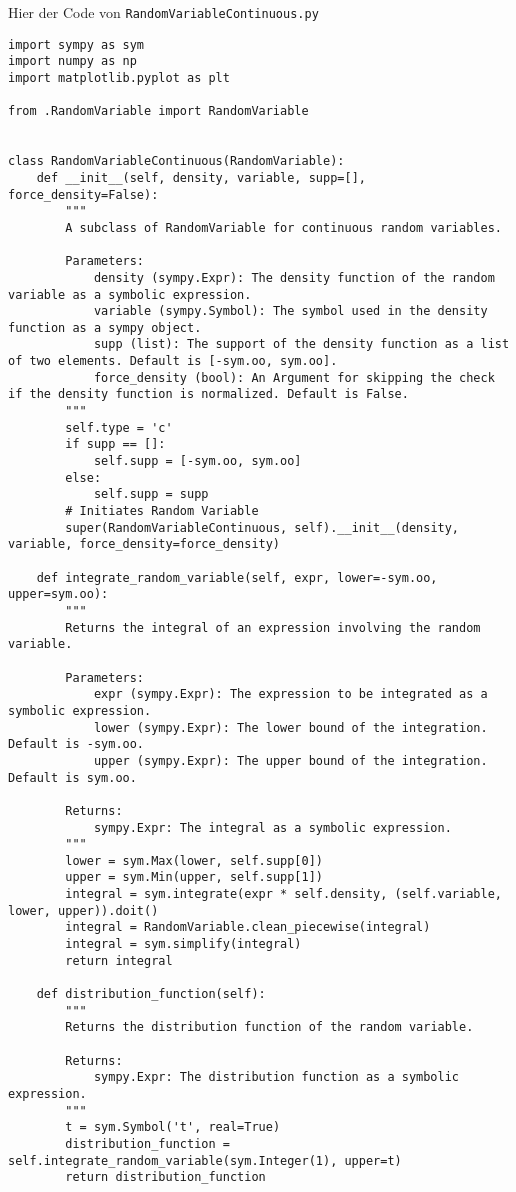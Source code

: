 Hier der Code von \lstinline|RandomVariableContinuous.py|
\begin{small}
\begin{lstlisting}
import sympy as sym
import numpy as np
import matplotlib.pyplot as plt

from .RandomVariable import RandomVariable


class RandomVariableContinuous(RandomVariable):
    def __init__(self, density, variable, supp=[], force_density=False):
        """
        A subclass of RandomVariable for continuous random variables.

        Parameters:
            density (sympy.Expr): The density function of the random variable as a symbolic expression.
            variable (sympy.Symbol): The symbol used in the density function as a sympy object.
            supp (list): The support of the density function as a list of two elements. Default is [-sym.oo, sym.oo].
            force_density (bool): An Argument for skipping the check if the density function is normalized. Default is False.
        """
        self.type = 'c'
        if supp == []:
            self.supp = [-sym.oo, sym.oo]
        else:
            self.supp = supp
        # Initiates Random Variable
        super(RandomVariableContinuous, self).__init__(density, variable, force_density=force_density)

    def integrate_random_variable(self, expr, lower=-sym.oo, upper=sym.oo):
        """
        Returns the integral of an expression involving the random variable.

        Parameters:
            expr (sympy.Expr): The expression to be integrated as a symbolic expression.
            lower (sympy.Expr): The lower bound of the integration. Default is -sym.oo.
            upper (sympy.Expr): The upper bound of the integration. Default is sym.oo.

        Returns:
            sympy.Expr: The integral as a symbolic expression.
        """
        lower = sym.Max(lower, self.supp[0])
        upper = sym.Min(upper, self.supp[1])
        integral = sym.integrate(expr * self.density, (self.variable, lower, upper)).doit()
        integral = RandomVariable.clean_piecewise(integral)
        integral = sym.simplify(integral)
        return integral

    def distribution_function(self):
        """
        Returns the distribution function of the random variable.

        Returns:
            sympy.Expr: The distribution function as a symbolic expression.
        """
        t = sym.Symbol('t', real=True)
        distribution_function = self.integrate_random_variable(sym.Integer(1), upper=t)
        return distribution_function


\end{lstlisting}
\end{small}
